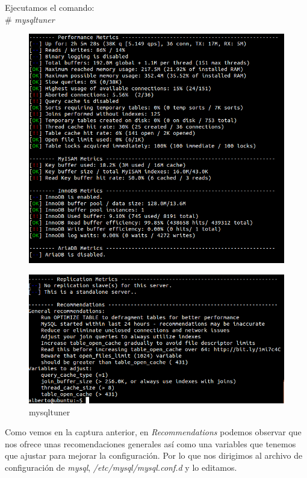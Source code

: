 Ejecutamos el comando: \\
\# \textit{mysqltuner} \\

\begin{figure}[h]
	\centering
	\includegraphics[scale=0.4]{images/mysql.png}
\end{figure} 

\begin{figure}[h]
	\centering
	\includegraphics[scale=0.4]{images/mysqltuner2.png}
	\caption{mysqltuner}
\end{figure}

\newpage
Como vemos en la captura anterior, en \textit{Recommendations} podemos observar que nos ofrece unas recomendaciones generales así como una variables que tenemos que ajustar para mejorar la configuración. Por lo que nos dirigimos al archivo de configuración de \textit{mysql}, \textit{/etc/mysql/mysql.conf.d} y lo editamos.

